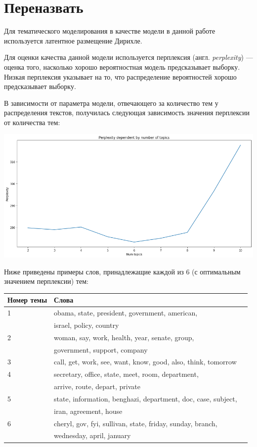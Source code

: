 \section{Переназвать}

Для тематического моделирования в качестве модели в данной работе используется латентное размещение Дирихле.

Для оценки качества данной модели используется перплексия (англ. \textit{perplexity}) --- оценка того, насколько хорошо вероятностная модель предсказывает выборку. Низкая перплексия указывает на то, что распределение вероятностей хорошо предсказывает выборку. 

В зависимости от параметра модели, отвечающего за количество тем у распределения текстов, получилась следующая зависимость значения перплексии от количества тем:

\includegraphics[scale=0.5]{pics/perplexity.png}

Ниже приведены примеры слов, принадлежащие каждой из 6 (с оптимальным значением перплексии) тем:

\begin{tabular}{ | l | l | l | }
\hline
Номер темы & Слова \\ \hline
1 & obama, state, president, government, american, \\ & israel,  policy, country \\ \hline
2 & woman, say, work, health, year, senate, group, \\ & government,  support, company \\ \hline
3 & call, get, work, see, want, know, good, also, think, tomorrow \\ \hline
4 & secretary, office, state, meet, room, department,  \\ &  arrive, route, depart, private \\ \hline 
5 & state, information, benghazi, department, doc, case, subject, \\ & iran, agreement, house \\ \hline
6 & cheryl, gov, fyi, sullivan, state, friday, sunday, branch,  \\ & wednesday, april, january \\ \hline 

\end{tabular}

